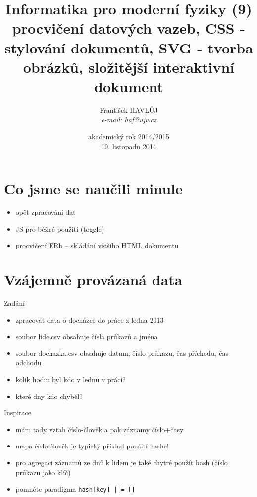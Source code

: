 \documentclass{beamer}
\title[IMF (9)]{Informatika pro moderní fyziky (9)\\ procvičení datových vazeb, CSS - stylování dokumentů, SVG - tvorba obrázků, složitější interaktivní dokument}
\author[Franti\v{s}ek HAVL\r{U}J, ORF ÚJV Řež]{Franti\v{s}ek HAVL\r{U}J\\{\scriptsize \emph{e-mail: haf@ujv.cz}}}
\date{akademický rok 2014/2015\\19. listopadu 2014}
\institute[ORF ÚJV Řež]
{ÚJV Řež\\oddělení Reaktorové fyziky a podpory palivového cyklu}
\begin{document}
\begin{frame}
  \titlepage
\end{frame}

\begin{frame}
  \tableofcontents
\end{frame}

\section{Co jsme se naučili minule}

\begin{frame}{}
  \begin{itemize}
    \item opět zpracování dat
    \item JS pro běžné použití (toggle)
    \item procvičení ERb -- skládání většího HTML dokumentu
  \end{itemize}
\end{frame}

\section{Vzájemně provázaná data}

\begin{frame}{Zadání}
  \begin{itemize}
    \item zpracovat data o docházce do práce z ledna 2013
    \item soubor lide.csv obsahuje čísla průkazů a jména
    \item soubor dochazka.csv obsahuje datum, číslo průkazu, čas příchodu, čas odchodu
    \item kolik hodin byl kdo v lednu v práci?
    \item které dny kdo chyběl?
  \end{itemize}
\end{frame}

\begin{frame}{Inspirace}
  \begin{itemize}
    \item mám tady vztah číslo-člověk a pak záznamy číslo+časy
    \item mapa číslo-člověk je typický příklad použití hashe!
    \item pro agregaci záznamů ze dnů k lidem je také chytré použít hash (číslo průkazu jako klíč)
    \item pomněte paradigma \texttt{hash[key] ||= []}
  \end{itemize}
\end{frame}
\end{document}
